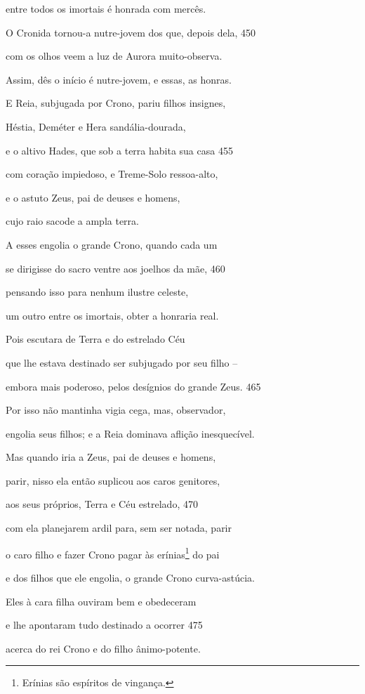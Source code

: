 entre todos os imortais é honrada com mercês.

O Cronida tornou-a nutre-jovem dos que, depois dela, \num{450}

com os olhos veem a luz de Aurora muito-observa.

Assim, dês o início é nutre-jovem, e essas, as honras.

\medskip

E Reia, subjugada por Crono, pariu filhos insignes,

Héstia, Deméter e Hera sandália-dourada,

e o altivo Hades, que sob a terra habita sua casa \num{455}

com coração impiedoso, e Treme-Solo ressoa-alto,

e o astuto Zeus, pai de deuses e homens,

cujo raio sacode a ampla terra.

A esses engolia o grande Crono, quando cada um

se dirigisse do sacro ventre aos joelhos da mãe, \num{460}

pensando isso para nenhum ilustre celeste,

um outro entre os imortais, obter a honraria real.

Pois escutara de Terra e do estrelado Céu

que lhe estava destinado ser subjugado por seu filho --

embora mais poderoso, pelos desígnios do grande Zeus. \num{465}

Por isso não mantinha vigia cega, mas, observador,

engolia seus filhos; e a Reia dominava aflição inesquecível.

Mas quando iria a Zeus, pai de deuses e homens,

parir, nisso ela então suplicou aos caros genitores,

aos seus próprios, Terra e Céu estrelado, \num{470}

com ela planejarem ardil para, sem ser notada, parir

o caro filho e fazer Crono pagar às erínias\footnote{Erínias são espíritos de vingança.} do pai

e dos filhos que ele engolia, o grande Crono curva-astúcia.

Eles à cara filha ouviram bem e obedeceram

e lhe apontaram tudo destinado a ocorrer \num{475}

acerca do rei Crono e do filho ânimo-potente.

